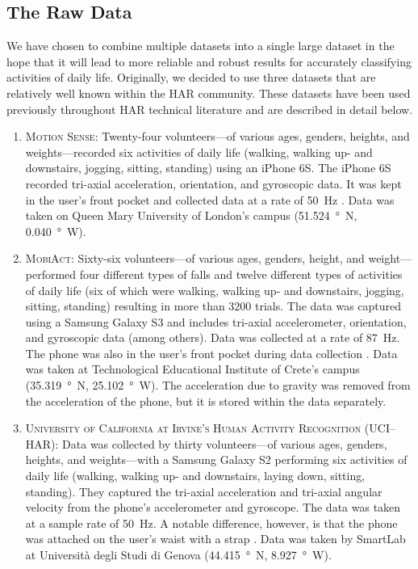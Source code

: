 \subsection{The Raw Data}
\label{sub:raw_data}

We have chosen to combine multiple datasets into a single large dataset in the hope that it will lead to more reliable and robust results for accurately classifying activities of daily life. Originally, we decided to use three datasets that are relatively well known within the HAR community. These datasets have been used previously throughout HAR technical literature and are described in detail below.
\begin{enumerate}
    \item \textsc{Motion Sense}: Twenty-four volunteers---of various ages, genders, heights, and weights---recorded six activities of daily life (walking, walking up- and downstairs, jogging, sitting, standing) using an iPhone 6S. The iPhone 6S recorded tri-axial acceleration, orientation, and gyroscopic data. It was kept in the user's front pocket and collected data at a rate of \SI{50}{\Hz} \cite{malekzadeh2018protecting}. Data was taken on Queen Mary University of London's campus (\SI{51.524}{\degree N}, \SI{0.040}{\degree W}).

    \item \textsc{MobiAct}: Sixty-six volunteers---of various ages, genders, height, and weight---performed four different types of falls and twelve different types of activities of daily life (six of which were walking, walking up- and downstairs, jogging, sitting, standing) resulting in more than 3200 trials. The data was captured using a Samsung Galaxy S3 and includes tri-axial accelerometer, orientation, and gyroscopic data (among others). Data was collected at a rate of \SI{87}{\Hz}. The phone was also in the user's front pocket during data collection \cite{vavoulas2016mobiact}. Data was taken at Technological    Educational  Institute  of  Crete's campus (\SI{35.319}{\degree N}, \SI{25.102}{\degree W}). The acceleration due to gravity was removed from the acceleration of the phone, but it is stored within the data separately.
    
    \item \textsc{University of California at Irvine's Human Activity Recognition (UCI--HAR)}: Data was collected by thirty volunteers---of various ages, genders, heights, and weights---with a Samsung Galaxy S2 performing six activities of daily life (walking, walking up- and downstairs, laying down, sitting, standing). They captured the tri-axial acceleration and tri-axial angular velocity from the phone's accelerometer and gyroscope. The data was taken at a sample rate of \SI{50}{\Hz}. A notable difference, however, is that the phone was attached on the user's waist with a strap \cite{anguita2013public}. Data was taken by SmartLab at Università degli Studi di Genova (\SI{44.415}{\degree N}, \SI{ 8.927}{\degree W}).
    

\end{enumerate}
